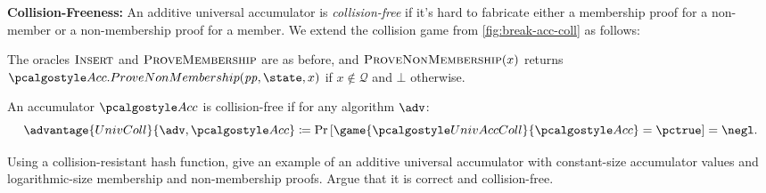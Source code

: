 \begin{mysolution}
  \textbf{Collision-Freeness:} An additive universal accumulator is \emph{collision-free} if it's hard to fabricate either a membership proof for a non-member or a non-membership proof for a member.
  We extend the collision game from \autoref{fig:break-acc-coll} as follows:
  
  \begin{center}
    \begin{tcolorbox}[width=13cm]
      \begin{pcvstack}[center]
      \end{pcvstack}
    \end{tcolorbox}
  \end{center}
  
  The oracles ${\normalfont\textsc{Insert}}$ and ${\normalfont\textsc{ProveMembership}}$ are as before, and ${\normalfont\textsc{ProveNonMembership}}(x)$ returns $\algo{Acc.ProveNonMembership}(\params, \state, x)$ if $x \notin \mathcal{Q}$ and $\bot$ otherwise.
  
  An accumulator $\algo{Acc}$ is collision-free if for any \ppt algorithm $\adv$:
  \[
    \advantage{UnivColl}{\adv, \algo{Acc}} \defeq \pr{\game{\algo{UnivAccColl}}{\algo{Acc}} = \pctrue} = \negl.
  \]
\end{mysolution}
\fi

\begin{exercise}[Optional]
  Using a collision-resistant hash function, give an example of an additive universal accumulator with constant-size accumulator values and logarithmic-size membership and non-membership proofs.
  Argue that it is correct and collision-free.
\end{exercise}

